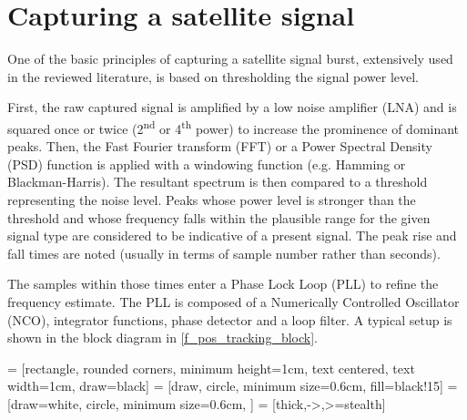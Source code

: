 \section{Capturing a satellite signal}
\label{s_pos_tracking_satellite}
One of the basic principles of capturing a satellite signal burst, extensively used in the reviewed literature, is based on thresholding the signal power level.

First, the raw captured signal is amplified by a low noise amplifier (LNA) and is squared once or twice (2\textsuperscript{nd} or 4\textsuperscript{th} power) to increase the prominence of dominant peaks. Then, the Fast Fourier transform (FFT) or a Power Spectral Density (PSD) function is applied with a windowing function (e.g. Hamming or Blackman-Harris). The resultant spectrum is then compared to a threshold representing the noise level. Peaks whose power level is stronger than the threshold and whose frequency falls within the plausible range for the given signal type are considered to be indicative of a present signal. The peak rise and fall times are noted (usually in terms of sample number rather than seconds). 

The samples within those times enter a Phase Lock Loop (PLL) to refine the frequency estimate. The PLL is composed of a Numerically Controlled Oscillator
(NCO), integrator functions, phase detector and a loop filter. A typical setup is shown in the block diagram in \autoref{f_pos_tracking_block}\cite{sop03, sop04, sop05}.

 = [rectangle, rounded corners, minimum height=1cm, text centered, text width=1cm, draw=black]
 = [draw, circle, minimum size=0.6cm, fill=black!15]
 = [draw=white, circle, minimum size=0.6cm, ]
 = [thick,->,>=stealth]

